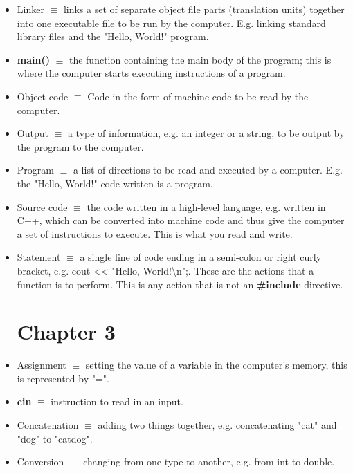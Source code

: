 \documentclass[12pt]{article}
\begin{document}
\begin{itemize}
\item Linker $\equiv$ links a set of separate object file parts (translation units) together into one executable file to be run by the computer. E.g. linking standard library files and the "Hello, World!" program.

\item \textbf{main()} $\equiv$ the function containing the main body of the program; this is where the computer starts executing instructions of a program.

\item Object code $\equiv$ Code in the form of machine code to be read by the computer.

\item Output $\equiv$ a type of information, e.g. an integer or a string, to be output by the program to the computer.

\item Program $\equiv$ a list of directions to be read and executed by a computer. E.g. the "Hello, World!" code written is a program.

\item Source code $\equiv$ the code written in a high-level language, e.g. written in C++, which can be converted into machine code and thus give the computer a set of instructions to execute. This is what you read and write.

\item Statement $\equiv$ a single line of code ending in a semi-colon or right curly bracket, e.g. cout << "Hello, World!\textbackslash n";. These are the actions that a function is to perform. This is any action that is not an \textbf{\#include} directive.

\section*{Chapter 3}

\item Assignment $\equiv$ setting the value of a variable in the computer's memory, this is represented by "=".

\item \textbf{cin} $\equiv$ instruction to read in an input.

\item Concatenation $\equiv$ adding two things together, e.g. concatenating "cat" and "dog" to "catdog".

\item Conversion $\equiv$ changing from one type to another, e.g. from int to double.


\end{itemize}
\end{document}
